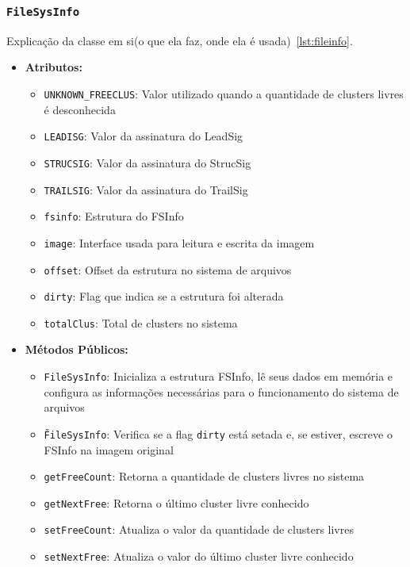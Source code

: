 \documentclass[
    12pt,				%
    oneside,   	        %
    a4paper,			%
    english,			%
    french,				%
    spanish,			%
    brazil,				%
    ]{pacotes/abntex2}
\begin{document}
\subsubsection{\texttt{FileSysInfo}}
\label{subsubsec:file_sys_info}

Explicação da classe em si(o que ela faz, onde ela é usada)~\ref{lst:fileinfo}.

\begin{itemize}
    \item \textbf{Atributos:}
        \begin{itemize}
            \item \texttt{UNKNOWN\_FREECLUS}: Valor utilizado quando a quantidade de clusters livres é desconhecida
            \item \texttt{LEADISG}: Valor da assinatura do LeadSig
            \item \texttt{STRUCSIG}: Valor da assinatura do StrucSig
            \item \texttt{TRAILSIG}: Valor da assinatura do TrailSig
            \item \texttt{fsinfo}: Estrutura do FSInfo
            \item \texttt{image}: Interface usada para leitura e escrita da imagem
            \item \texttt{offset}: Offset da estrutura no sistema de arquivos
            \item \texttt{dirty}: Flag que indica se a estrutura foi alterada
            \item \texttt{totalClus}: Total de clusters no sistema
        \end{itemize}
    \item \textbf{Métodos Públicos:}
        \begin{itemize}
            \item \texttt{FileSysInfo}: Inicializa a estrutura FSInfo, lê seus dados em memória e configura as informações necessárias para o funcionamento do sistema de arquivos
            \item \texttt{\~FileSysInfo}: Verifica se a flag \texttt{dirty} está setada e, se estiver, escreve o FSInfo na imagem original
            \item \texttt{getFreeCount}: Retorna a quantidade de clusters livres no sistema
            \item \texttt{getNextFree}: Retorna o último cluster livre conhecido
            \item \texttt{setFreeCount}: Atualiza o valor da quantidade de clusters livres
            \item \texttt{setNextFree}: Atualiza o valor do último cluster livre conhecido
        \end{itemize}
\end{itemize}
\end{document}
